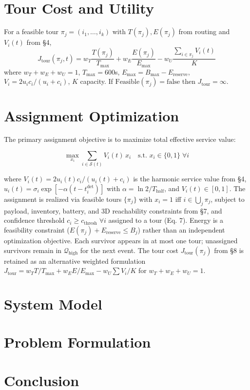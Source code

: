 \documentclass[conference]{IEEEtran}
\begin{document}
\section{Tour Cost and Utility}
For a feasible tour $\pi_j=(i_1,\dots,i_k)$ with $T(\pi_j),E(\pi_j)$ from routing and $V_i(t)$ from \S4,
\begin{equation}
J_{\text{tour}}(\pi_j,t)=w_T\frac{T(\pi_j)}{T_{\max}}+w_E\frac{E(\pi_j)}{E_{\max}}-w_U\frac{\sum_{i\in\pi_j}V_i(t)}{K}
\end{equation}
where $w_T+w_E+w_U=1$, $T_{\max}=600$s, $E_{\max}=B_{\max}-E_{\text{reserve}}$, $V_i=2u_ic_i/(u_i+c_i)$, $K$ capacity. If $\text{Feasible}(\pi_j)=\text{false}$ then $J_{\text{tour}}=\infty$.

\section{Assignment Optimization}
The primary assignment objective is to maximize total effective service value:

\begin{equation}
\max_{x_i} \sum_{i\in\mathcal{S}(t)} V_i(t)\,x_i \quad \text{s.t. } x_i\in\{0,1\}\;\forall i
\end{equation}

where $V_i(t)=2u_i(t)c_i/(u_i(t)+c_i)$ is the harmonic service value from \S4, $u_i(t)=\sigma_i\exp[-\alpha(t-t_i^{\text{det}})]$ with $\alpha=\ln2/T_{\text{half}}$, and $V_i(t)\in[0,1]$. The assignment is realized via feasible tours $\{\pi_j\}$ with $x_i=1$ iff $i\in\bigcup_j\pi_j$, subject to payload, inventory, battery, and 3D reachability constraints from \S7, and confidence threshold $c_i\geq c_{\text{thresh}}\;\forall i$ assigned to a tour (Eq. 7). Energy is a feasibility constraint ($E(\pi_j)+E_{\text{reserve}}\leq B_j$) rather than an independent optimization objective. Each survivor appears in at most one tour; unassigned survivors remain in $\mathcal{Q}_{\text{high}}$ for the next event. The tour cost $J_{\text{tour}}(\pi_j)$ from \S8 is retained as an alternative weighted formulation $J_{\text{tour}}=w_TT/T_{\max}+w_EE/E_{\max}-w_U\sum V_i/K$ for $w_T+w_E+w_U=1$.

\section{System Model}

\section{Problem Formulation}

\section{Conclusion}
\end{document}
